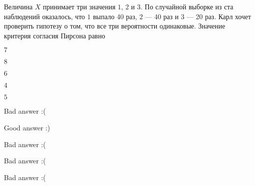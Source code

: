 
\begin{question}
Величина \(X\) принимает три значения \(1\), \(2\) и \(3\). По случайной
выборке из ста наблюдений оказалось, что \(1\) выпало 40 раз, \(2\) ---
40 раз и \(3\) --- 20 раз. Карл хочет проверить гипотезу о том, что все
три вероятности одинаковые. Значение критерия согласия Пирсона равно
\begin{answerlist}
  \item \(7\)
  \item \(8\)
  \item \(6\)
  \item \(4\)
  \item \(5\)
\end{answerlist}
\end{question}

\begin{solution}
\begin{answerlist}
  \item Bad answer :(
  \item Good answer :)
  \item Bad answer :(
  \item Bad answer :(
  \item Bad answer :(
\end{answerlist}
\end{solution}

